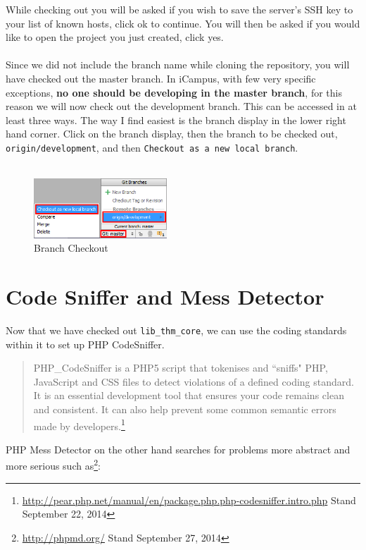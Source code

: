 \documentclass[]{report}
\begin{document}
\noindent
While checking out you will be asked if you wish to save the server's SSH key to your list of known hosts, click ok to continue. You will then be asked if you would like to open the project you just created, click yes.\\
\\
Since we did not include the branch name while cloning the repository, you will have checked out the master branch. In iCampus, with few very specific exceptions, \textbf{no one should be developing in the master branch}, for this reason we will now check out the development branch. This can be accessed in at least three ways. The way I find easiest is the branch display in the lower right hand corner. Click on the branch display, then the branch to be checked out, \texttt{origin/development}, and then \texttt{Checkout as a new local branch}.\\
\\
\begin{figure}[h] 
	\centering
	\includegraphics[width=5cm]{checkoutbranch.png}
	\caption{Branch Checkout}
	\vspace{-15pt}
\end{figure}

\newpage

\section{Code Sniffer and Mess Detector}
\label{sec:qatools}

Now that we have checked out \texttt{lib\_thm\_core}, we can use the coding standards within it to set up PHP CodeSniffer.

\begin{quote}
	PHP\_CodeSniffer is a PHP5 script that tokenises and ``sniffs" PHP, JavaScript and CSS files to detect violations of a defined coding standard. It is an essential development tool that ensures your code remains clean and consistent. It can also help prevent some common semantic errors made by developers.\footnote{\url{http://pear.php.net/manual/en/package.php.php-codesniffer.intro.php} Stand September 22, 2014}
\end{quote}

\noindent
PHP Mess Detector on the other hand searches for problems more abstract and more serious such as\footnote{\url{http://phpmd.org/} Stand September 27, 2014}:
\end{document}
